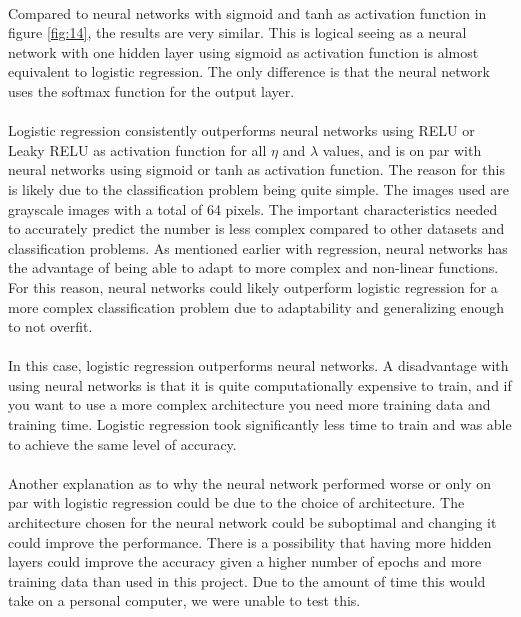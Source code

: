 \documentclass[a4paper,twocolumn]{article}
\begin{document}
\\
Compared to neural networks with sigmoid and tanh as activation function in figure \ref{fig:14}, the results are very similar. This is logical seeing as a neural network with one hidden layer using sigmoid as activation function is almost equivalent to logistic regression. The only difference is that the neural network uses the softmax function for the output layer.\\
\\
Logistic regression consistently outperforms neural networks using RELU or Leaky RELU as activation function for all $\eta$ and $\lambda$ values, and is on par with neural networks using sigmoid or tanh as activation function. The reason for this is likely due to the classification problem being quite simple. The images used are grayscale images with a total of 64 pixels. The important characteristics needed to accurately predict the number is less complex compared to other datasets and classification problems. As mentioned earlier with regression, neural networks has the advantage of being able to adapt to more complex and non-linear functions. For this reason, neural networks could likely outperform logistic regression for a more complex classification problem due to adaptability and generalizing enough to not overfit.\\
\\
In this case, logistic regression outperforms neural networks. A disadvantage with using neural networks is that it is quite computationally expensive to train, and if you want to use a more complex architecture you need more training data and training time. Logistic regression took significantly less time to train and was able to achieve the same level of accuracy. \\
\\
Another explanation as to why the neural network performed worse or only on par with logistic regression could be due to the choice of architecture. The architecture chosen for the neural network could be suboptimal and changing it could improve the performance. There is a possibility that having more hidden layers could improve the accuracy given a higher number of epochs and more training data than used in this project. Due to the amount of time this would take on a personal computer, we were unable to test this.
\end{document}

